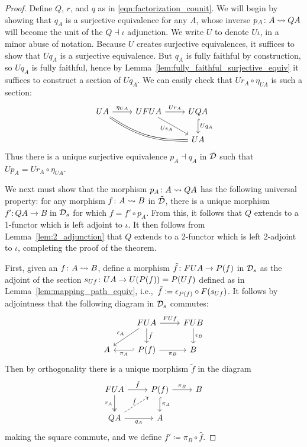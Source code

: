 \documentclass[11pt,oneside,article]{memoir}
\begin{document}
\begin{proof}
   Define $Q$, $r$, and $q$ as in \eqref{eqn:factorization_counit}. We will begin by showing that
   $q_A$ is a surjective equivalence for any $A$, whose inverse $p_A\colon A\rightsquigarrow QA$ will become the
   unit of the $Q\dashv\iota$ adjunction. We write $U$ to denote $U\iota$, in a minor abuse of
   notation. Because $U$ creates surjective equivalences, it suffices to show that $Uq_A$ is a
   surjective equivalence. But $q_A$ is fully faithful by construction, so $Uq_A$ is fully faithful,
   hence by Lemma~\ref{lem:fully_faithful_surjective_equiv} it suffices to construct a section of
   $Uq_A$. We can easily check that $Ur_A\circ\eta_{UA}$ is such a section:
   \[ \begin{tikzcd}
      UA \ar[r,"\eta_{UA}"] \ar[rrd,bend right=18,equal]
         & UFUA \ar[r,"Ur_A"] \ar[dr,"U\epsilon_A"' inner sep=0pt]
         & UQA \ar[d,hook,"Uq_A"] \\
      && UA
   \end{tikzcd} \]
   Thus there is a unique surjective equivalence $p_A\dashv q_A$ in $\tilde{\mathcal{D}}$ such that $Up_A=
   Ur_A\circ\eta_{UA}$.

   We next must show that the morphism $p_A\colon A\rightsquigarrow QA$ has the following universal property:
   for any morphism $f\colon A\rightsquigarrow B$ in $\tilde{\mathcal{D}}$, there is a unique morphism $f'\colon QA\to B$
   in $\mathcal{D}_s$ for which $f=f'\circ p_A$. From this, it follows that $Q$ extends to a 1-functor
   which is left adjoint to $\iota$. It then follows from Lemma~\ref{lem:2_adjunction} that $Q$
   extends to a 2-functor which is left 2-adjoint to $\iota$, completing the proof of the theorem.

   First, given an $f\colon A\rightsquigarrow B$, define a morphism $\tilde{f}\colon FUA\to P(f)$ in
   $\mathcal{D}_s$ as the adjoint of the section $s_{Uf}\colon UA\to U(P(f))=P(Uf)$ defined as in
   Lemma~\ref{lem:mapping_path_equiv}, i.e.,~$\tilde{f}\coloneqq\epsilon_{P(f)}\circ F(s_{Uf})$.
   It follows by adjointness that the following diagram in $\mathcal{D}_s$ commutes:
   \[ \begin{tikzcd}
      & FUA \ar[dl,"\epsilon_A"'] \ar[d,"\tilde{f}"] \ar[r,"FUf"]
         & FUB \ar[d,"\epsilon_B"] \\
      A & \Path{f} \ar[l,hook',"\pi_A"] \ar[r,"\pi_B"']
         & B
   \end{tikzcd} \]
   Then by orthogonality there is a unique morphism $\tilde{f}$ in the diagram
   \[ \begin{tikzcd}
      FUA \ar[r,"\tilde{f}"] \ar[d,two heads,"r_A"']
         & \Path{f} \ar[d,hook,"\pi_A"] \ar[r,"\pi_B"]
         & B \\
      QA \ar[r,"q_A"'] \ar[ur,dashed,"\hat{f}" inner sep=0pt] & A
   \end{tikzcd} \]
   making the square commute, and we define $f'\coloneqq \pi_B\circ\hat{f}$.


\end{proof}
\end{document}
